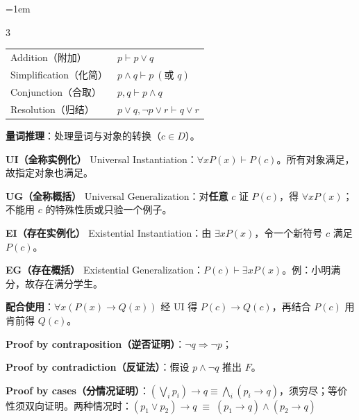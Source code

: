 \documentclass[a4paper,twoside,fontset=none]{ctexart}
\renewcommand{\b}[1]{\textbf{#1}}
\newcommand{\block}[1]{\par\noindent\textbf{#1}}
\newenvironment{sheetcolumns}{\linespread{1}\fontsize{7.4}{8.7}\selectfont\raggedright\emergencystretch=1em\begin{multicols}{3}}{\end{multicols}}
\begin{document}
\begin{sheetcolumns}
\begin{tabular}{@{}ll@{}}
Addition（附加）&$p\vdash p\lor q$\\
Simplification（化简）&$p\land q\vdash p\ (\text{或 }q)$\\
Conjunction（合取）&$p,q\vdash p\land q$\\
Resolution（归结）&$p\lor q,\neg p\lor r\vdash q\lor r$
\end{tabular}\par
\block{量词推理}：处理量词与对象的转换（$c\in D$）。\par
\block{UI（全称实例化）} Universal Instantiation：$\forall xP(x)\vdash P(c)$。所有对象满足，故指定对象也满足。\par
\block{UG（全称概括）} Universal Generalization：对\b{任意} $c$ 证 $P(c)$，得 $\forall xP(x)$；不能用 $c$ 的特殊性质或只验一个例子。\par
\block{EI（存在实例化）} Existential Instantiation：由 $\exists xP(x)$，令一个新符号 $c$ 满足 $P(c)$。\par
\block{EG（存在概括）} Existential Generalization：$P(c)\vdash\exists xP(x)$。例：小明满分，故存在满分学生。\par
\block{配合使用}：$\forall x(P(x)\to Q(x))$ 经 UI 得 $P(c)\to Q(c)$，再结合 $P(c)$ 用肯前得 $Q(c)$。
\block{Proof by contraposition（逆否证明）}：$\neg q\Rightarrow\neg p$；
\block{Proof by contradiction（反证法）}：假设 $p\land\neg q$ 推出 $F$。
\block{Proof by cases（分情况证明）}：$(\bigvee_i p_i)\to q\equiv\bigwedge_i(p_i\to q)$，须穷尽；等价性须双向证明。两种情况时：$(p_1\lor p_2)\to q\;\equiv\;(p_1\to q)\land(p_2\to q)$


\end{sheetcolumns}
\end{document}
